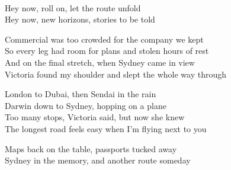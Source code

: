 \begin{lyrics}
\\
Hey now, roll on, let the route unfold\\
Hey now, new horizons, stories to be told

Commercial was too crowded for the company we kept\\
So every leg had room for plans and stolen hours of rest\\
And on the final stretch, when Sydney came in view\\
Victoria found my shoulder and slept the whole way through

London to Dubai, then Sendai in the rain\\
Darwin down to Sydney, hopping on a plane\\
Too many stops, Victoria said, but now she knew\\
The longest road feels easy when I'm flying next to you

Maps back on the table, passports tucked away\\
Sydney in the memory, and another route someday
\end{lyrics}


